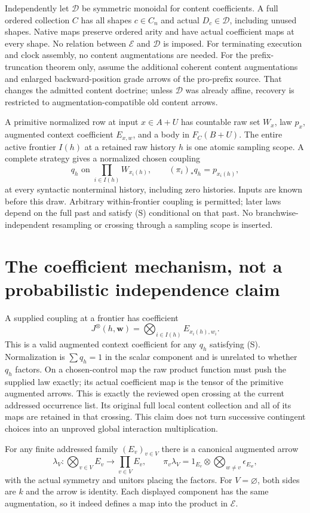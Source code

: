 \documentclass[11pt]{article}
\newcommand{\E}{\mathcal E}
\begin{document}
Independently let $\mathcal D$ be symmetric monoidal for content coefficients. A full ordered collection $C$ has all shapes $c\in C_n$ and actual $D_c\in\mathcal D$, including unused shapes. Native maps preserve ordered arity and have actual coefficient maps at every shape. No relation between $\E$ and $\mathcal D$ is imposed. For terminating execution and clock assembly, no content augmentations are needed. For the prefix-truncation theorem only, assume the additional coherent content augmentations and enlarged backward-position grade arrows of the pro-prefix source. That changes the admitted content doctrine; unless $\mathcal D$ was already affine, recovery is restricted to augmentation-compatible old content arrows.

A primitive normalized row at input $x\in A+U$ has countable raw set $W_x$, law $p_x$, augmented context coefficient $E_{x,w}$, and a body in $F_C(B+U)$. The entire active frontier $I(h)$ at a retained raw history $h$ is one atomic sampling scope. A complete strategy gives a normalized chosen coupling
\[
 q_h\text{ on }\prod_{i\in I(h)}W_{x_i(h)},\qquad
 (\pi_i)_*q_h=p_{x_i(h)},                                  \tag{S}
\]
at every syntactic nonterminal history, including zero histories. Inputs are known before this draw. Arbitrary within-frontier coupling is permitted; later laws depend on the full past and satisfy (S) conditional on that past. No branchwise-independent resampling or crossing through a sampling scope is inserted.

\section{The coefficient mechanism, not a probabilistic independence claim}
A supplied coupling at a frontier has coefficient
\[
 J^\otimes(h,\mathbf w)=\bigotimes_{i\in I(h)}E_{x_i(h),w_i}.
\]
This is a valid augmented context coefficient for any $q_h$ satisfying (S). Normalization is $\sum q_h=1$ in the scalar component and is unrelated to whether $q_h$ factors. On a chosen-control map the raw product function must push the supplied law exactly; its actual coefficient map is the tensor of the primitive augmented arrows. This is exactly the reviewed open crossing at the current addressed occurrence list. Its original full local content collection and all of its maps are retained in that crossing. This claim does not turn successive contingent choices into an unproved global interaction multiplication.

For any finite addressed family $(E_v)_{v\in V}$ there is a canonical augmented arrow
\[
 \lambda_V:\bigotimes_{v\in V}E_v\longrightarrow\prod_{v\in V}E_v,\qquad
 \pi_v\lambda_V=1_{E_v}\otimes\bigotimes_{w\ne v}\epsilon_{E_w},       \tag{1}
\]
with the actual symmetry and unitors placing the factors. For $V=\varnothing$, both sides are $k$ and the arrow is identity. Each displayed component has the same augmentation, so it indeed defines a map into the product in $\E$.
\end{document}
